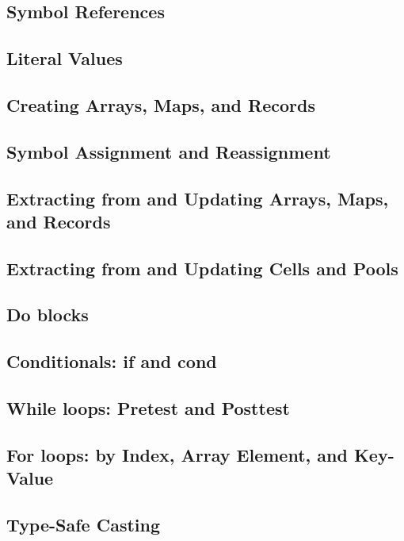 \documentclass{article}
\begin{document}
\subsection{Symbol References}

\subsection{Literal Values}

\subsection{Creating Arrays, Maps, and Records}

\subsection{Symbol Assignment and Reassignment}

\subsection{Extracting from and Updating Arrays, Maps, and Records}

\subsection{Extracting from and Updating Cells and Pools}

\subsection{Do blocks}

\subsection{Conditionals: if and cond}

\subsection{While loops: Pretest and Posttest}

\subsection{For loops: by Index, Array Element, and Key-Value}

\subsection{Type-Safe Casting}
\end{document}
